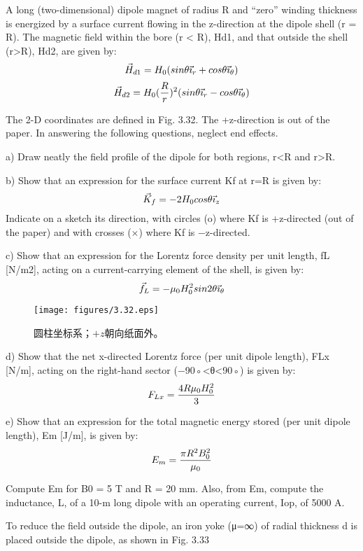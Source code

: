 A long (two-dimensional) dipole magnet of radius R and “zero” winding thickness
is energized by a surface current flowing in the z-direction at the dipole shell
(r = R). The magnetic field within the bore (r < R), Hd1, and that outside the
shell (r>R), Hd2, are given by:
$$
\vec{H}_{d1}=H_{0}(sin\theta\vec{\imath}_{r}+cos\theta\vec{\imath}_{\theta})\\%
$$
$$
\vec{H}_{d2}=H_{0}(\frac{R}{r})^2(sin\theta\vec{\imath}_{r}-cos\theta\vec{\imath}_{\theta})\\%
$$

The 2-D coordinates are defined in Fig. 3.32. The +z-direction is out of the paper.
In answering the following questions, neglect end effects.

a) Draw neatly the field profile of the dipole for both regions, r<R and r>R.

b) Show that an expression for the surface current Kf at r=R is given by:
$$
\vec{K}_{f}=-2H_{0}cos\theta\vec{\imath}_{z}\\%
$$
Indicate on a sketch its direction, with circles (o) where Kf is +z-directed
(out of the paper) and with crosses (×) where Kf is −z-directed.

c) Show that an expression for the Lorentz force density per unit length, fL
[N/m2], acting on a current-carrying element of the shell, is given by:
$$
\vec{f}_{L}=-\mu_{0}H_{0}^{2}sin2\theta\vec{\imath}_{\theta}\\%
$$
\begin{figure}[htbp]
	\centering
	\texttt{[image: figures/3.32.eps]}
	\caption{圆柱坐标系；$+z$朝向纸面外。}
\end{figure}

d) Show that the net x-directed Lorentz force (per unit dipole length), FLx
[N/m], acting on the right-hand sector (−90◦<θ<90◦) is given by:
$$
F_{Lx}=\frac{4R\mu_{0}H_{0}^{2}}{3}\\%
$$

e) Show that an expression for the total magnetic energy stored (per unit dipole
length), Em [J/m], is given by:
$$
E_{m}=\frac{\pi R^{2}B_{0}^{2}}{\mu_{0}}\\%
$$

Compute Em for B0 = 5 T and R = 20 mm. Also, from Em, compute the
inductance, L, of a 10-m long dipole with an operating current, Iop, of 5000 A.

To reduce the field outside the dipole, an iron yoke (μ=∞) of radial thickness d
is placed outside the dipole, as shown in Fig. 3.33

